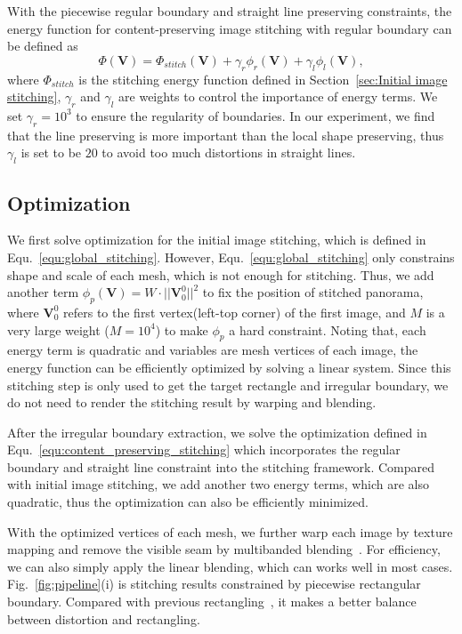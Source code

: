 \documentclass[10pt,journal,compsoc]{IEEEtran}
\begin{document}
With the piecewise regular boundary and straight line preserving constraints,  the energy function for content-preserving image stitching with regular boundary can be defined as
\begin{equation} \label{equ:content_preserving_stitching}
\Phi(\textbf{V})=\Phi_{stitch}(\textbf{V})+\gamma_r \phi_r(\textbf{V})+\gamma_l \phi_l(\textbf{V}),
\end{equation}
where $\Phi_{stitch}$ is the stitching energy function defined in Section~\ref{sec:Initial image stitching}, $\gamma_r$ and $\gamma_l$ are weights to control the importance of energy terms. We set $\gamma_r=10^3$ to ensure the regularity of boundaries.
In our experiment, we find that the line preserving is more important than the local shape preserving, thus $\gamma_l$ is set to be $20$ to avoid too much distortions in straight lines.

\subsection{Optimization}
We first solve optimization for the initial image stitching, which is defined in Equ.~\ref{equ:global_stitching}.
However, Equ.~\ref{equ:global_stitching} only constrains shape and scale of each mesh, which is not enough for stitching.
Thus, we add another term $\phi_p(\mathbf{V})=W\cdot||\mathbf{V}_0^0||^2$ to fix the position of stitched panorama, where
$\mathbf{V}_0^0$ refers to the first vertex(left-top corner) of the first image, and $M$ is a very large weight ($M=10^4$) to make $\phi_p$ a hard constraint.
Noting that, each energy term is quadratic and variables are mesh vertices of each image, the energy function can be efficiently optimized by solving a linear system.
Since this stitching step is only used to get the target rectangle and irregular boundary, we do not need to render the stitching result by warping and blending.

After the irregular boundary extraction, we solve the optimization defined in Equ.~\ref{equ:content_preserving_stitching} which incorporates the regular boundary and straight line constraint into the stitching framework.
Compared with initial image stitching, we add another two energy terms, which are also quadratic, thus the optimization can also be efficiently minimized.

With the optimized vertices of each mesh, we further warp each image by texture mapping and remove the visible seam by multibanded blending~\cite{journals/tip/ZhuLWZMLH18}.
For efficiency, we can also simply apply the linear blending, which can works well in most cases.
Fig.~\ref{fig:pipeline}(i) is stitching results constrained by piecewise rectangular boundary. Compared with previous rectangling~\cite{journals/tog/HeC013}, it makes a better balance between distortion and rectangling.
\end{document}
